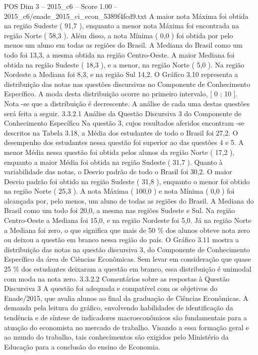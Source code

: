 \begin{textsample}{POS Dim 3 – 2015\_c6 – Score 1.00 – 2015\_c6/enade\_2015\_ci\_econ\_5389f4fcd9.txt}
A maior nota Máxima foi obtida na região Sudeste ( 91,7 ), enquanto a menor nota Máxima foi encontrada na região Norte ( 58,3 ).
Além disso, a nota Mínima ( 0,0 ) foi obtida por pelo menos um aluno em todas as regiões do Brasil.
A Mediana do Brasil como um todo foi 13,3, a mesma obtida na região Centro-Oeste.
A maior Mediana foi obtida na região Sudeste ( 18,3 ), e a menor, na região Norte ( 5,0 ).
Na região Nordeste a Mediana foi 8,3, e na região Sul 14,2.
O Gráfico 3.10 representa a distribuição das notas nas questões discursivas no Componente de Conhecimento Específico.
A moda desta distribuição ocorre no primeiro intervalo, [ 0 ; 10 ].
Nota -se que a distribuição é decrescente.
A análise de cada uma destas questões será feita a seguir. 3.3.2.1 Análise da Questão Discursiva 3 do Componente de Conhecimento Específico Na questão 3, cujos resultados aferidos encontram -se descritos na Tabela 3.18, a Média dos estudantes de todo o Brasil foi 27,2.
O desempenho dos estudantes nessa questão foi superior ao das questões 4 e 5.
A menor Média nessa questão foi obtida pelos alunos da região Norte ( 17,2 ), enquanto a maior Média foi obtida na região Sudeste ( 31,7 ).
Quanto à variabilidade das notas, o Desvio padrão de todo o Brasil foi 30,2.
O maior Desvio padrão foi obtido na região Sudeste ( 31,8 ), enquanto o menor foi obtido na região Norte ( 25,3 ).
A nota Máxima ( 100,0 ) e nota Mínima ( 0,0 ) foi alcançada por, pelo menos, um aluno de todas as regiões do Brasil.
A Mediana do Brasil como um todo foi 20,0, a mesma nas regiões Sudeste e Sul.
Na região Centro-Oeste a Mediana foi 15,0, e na região Nordeste foi 5,0.
Já na região Norte a Mediana foi zero, o que significa que mais de 50 \% dos alunos obteve nota zero ou deixou a questão em branco nessa região do país.
O Gráfico 3.11 mostra a distribuição das notas na questão discursiva 3, do Componente de Conhecimento Específico da área de Ciências Econômicas.
Sem levar em consideração que quase 25 \% dos estudantes deixaram a questão em branco, essa distribuição é unimodal com moda na nota zero. 3.3.2.2 Comentários sobre as respostas à Questão Discursiva 3 A questão foi adequada e compatível com os objetivos do Enade/2015, que avalia alunos ao final da graduação de Ciências Econômicas.
A demanda pela leitura do gráfico, envolvendo habilidades de identificação da tendência e de síntese de indicadores macroeconômicos são fundamentais para a atuação do economista no mercado de trabalho.
Visando a essa formação geral e ao mundo do trabalho, tais conhecimentos são exigidos pelo Ministério da Educação para a conclusão do ensino de Economia.

\end{textsample}
